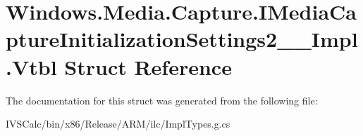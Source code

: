 \hypertarget{struct_windows_1_1_media_1_1_capture_1_1_i_media_capture_initialization_settings2_____impl_1_1_vtbl}{}\section{Windows.\+Media.\+Capture.\+I\+Media\+Capture\+Initialization\+Settings2\+\_\+\+\_\+\+Impl.\+Vtbl Struct Reference}
\label{struct_windows_1_1_media_1_1_capture_1_1_i_media_capture_initialization_settings2_____impl_1_1_vtbl}


The documentation for this struct was generated from the following file\+:\begin{DoxyCompactItemize}
\item 
I\+V\+S\+Calc/bin/x86/\+Release/\+A\+R\+M/ilc/Impl\+Types.\+g.\+cs\end{DoxyCompactItemize}
